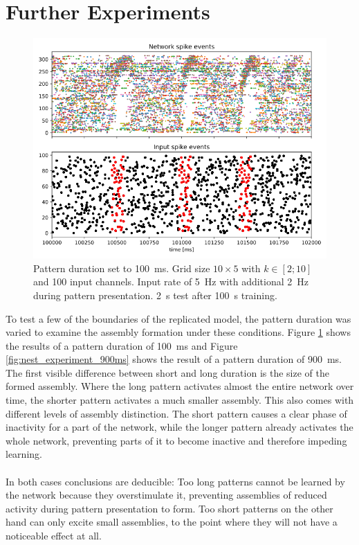 \section{Further Experiments}
\begin{figure}[htbp]
    \centering
    \includegraphics[width=\columnwidth]{Figures/nest_experiment_100ms.png}
    \caption{Pattern duration set to \SI{100}{\milli\second}. Grid size $10\times 5$ with $k\in[2;10]$ and 100 input channels. Input rate of \SI{5}{\hertz} with additional \SI{2}{\hertz} during pattern presentation. \SI{2}{\second} test after \SI{100}{\second} training.}
    \label{fig:nest_experiment_100ms}
\end{figure}
To test a few of the boundaries of the replicated model, the pattern duration was varied to examine the assembly formation under these conditions. Figure \ref{fig:nest_experiment_100ms} shows the results of a pattern duration of \SI{100}{\milli\second} and Figure \ref{fig:nest_experiment_900ms} shows the result of a pattern duration of \SI{900}{\milli\second}. The first visible difference between short and long duration is the size of the formed assembly. Where the long pattern activates almost the entire network over time, the shorter pattern activates a much smaller assembly. This also comes with different levels of assembly distinction. The short pattern causes a clear phase of inactivity for a part of the network, while the longer pattern already activates the whole network, preventing parts of it to become inactive and therefore impeding learning.
\\ \ \\
In both cases conclusions are deducible: Too long patterns cannot be learned by the network because they overstimulate it, preventing assemblies of reduced activity during pattern presentation to form. Too short patterns on the other hand can only excite small assemblies, to the point where they will not have a noticeable effect at all.
